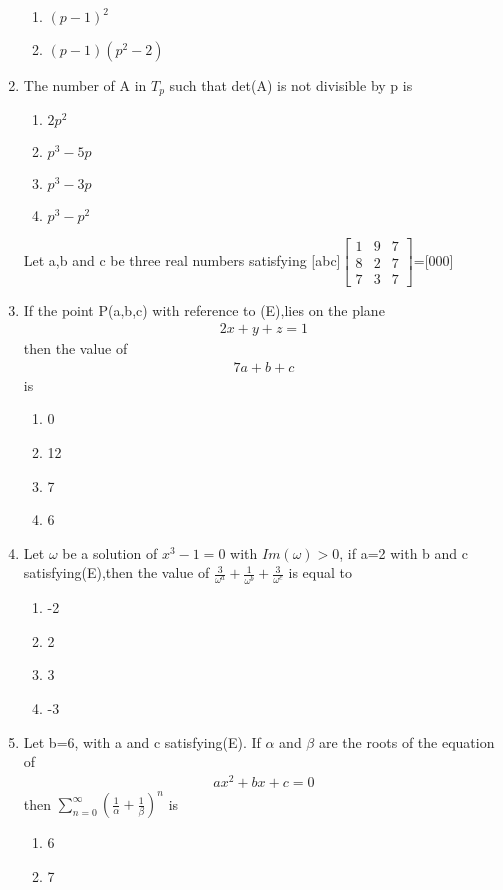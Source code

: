 \begin{enumerate}[label=\arabic*.,ref=\thesubsection.\theenumi]
\begin{enumerate}
 \item $(p-1)^2$
 \item $(p-1)(p^2-2)$
\end{enumerate}
\item The number of A in $T_p$ such that det(A) is not divisible by p is
\begin{enumerate}
 \item $2p^2$
 \item $p^3-5p$
 \item $p^3-3p$
 \item $p^3-p^2$
\end{enumerate}
Let a,b and c be three real numbers satisfying [abc]$\begin{bmatrix} 1 & 9 & 7 \\ 8 & 2 & 7 \\ 7 & 3 & 7 \end{bmatrix}$=[000]
\item If the point P(a,b,c) with reference to (E),lies on the plane 
\begin{align} 
2x+y+z=1
\end{align} then the value of 
\begin{align} 
7a+b+c
\end{align} is
\begin{enumerate}
 \item 0
 \item 12
 \item 7
 \item 6
\end{enumerate}
\item Let $\omega$ be a solution of $x^3-1=0$ with $Im(\omega)>0$, if a=2 with b and c satisfying(E),then the value of $\frac{3}{\omega^a}+\frac{1}{\omega^b}+\frac{3}{\omega^c}$ is equal to 
\begin{enumerate}
 \item -2
 \item  2
 \item 3
 \item -3
\end{enumerate}
\item Let b=6, with a and c satisfying(E). If $\alpha$ and $\beta$ are the roots of the equation of  
\begin{align}
ax^2+bx+c=0
\end{align} then $\sum_{n = 0}^\infty (\frac{1}{\alpha}+\frac{1}{\beta})^n$ is 
\begin{enumerate}
 \item 6
 \item 7

\end{enumerate}
\end{enumerate}
